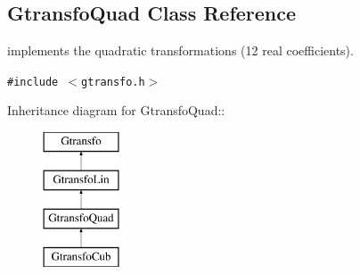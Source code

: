 \subsection{Gtransfo\-Quad  Class Reference}
\label{class_gtransfoquad}
implements the quadratic transformations (12 real coefficients). 


{\tt \#include $<$gtransfo.h$>$}

Inheritance diagram for Gtransfo\-Quad::\begin{figure}[H]
\begin{center}
\leavevmode
\includegraphics[height=4cm]{class_gtransfoquad}
\end{center}
\end{figure}
